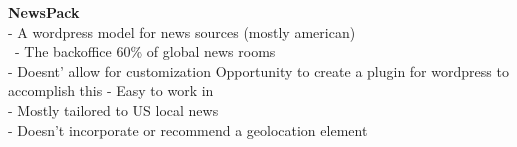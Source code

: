 \textbf{NewsPack}\\
-{\color{orange} A wordpress model for news sources (mostly american) \cite{Carvalho2020}}\\\
-{\color{orange} The backoffice 60\% of global news rooms \cite{Caravalho2020}}\\
-{\color{orange} Doesnt' allow for customization \cite{Caravalho2020}}{\color{purple} Opportunity to create a plugin for wordpress to accomplish this}
-{\color{orange} Easy to work in\cite{Carvalho2020}}\\
-{\color{orange} Mostly tailored to US local news \cite{Carvalho2020}}\\
-{\color{purple} Doesn't incorporate or recommend a geolocation element \cite{newspack}}\\

